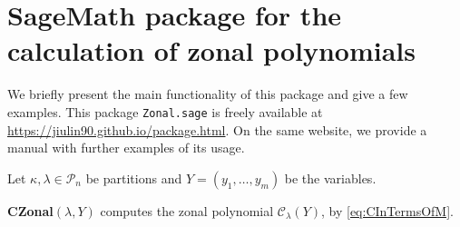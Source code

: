 \documentclass{mathincs}
\numberwithin{equation}{section}
\numberwithin{figure}{section}
\theoremstyle{plain}
\theoremstyle{definition}
\theoremstyle{remark}
\theoremstyle{plain}
\theoremstyle{definition}
\theoremstyle{plain}
\theoremstyle{plain}
\begin{document}
\section{SageMath package for the calculation of zonal polynomials}\label{sec:Package}

We briefly present the main functionality of this package and give a few examples. This package \texttt{Zonal.sage} is freely available at
\url{https://jiulin90.github.io/package.html}.  On the same website, we provide a
manual with further examples of its usage.

Let $\kappa, \lambda\in\mathcal{P}_n$ be partitions and $Y=(y_1,\ldots,y_m)$ be the variables.
\vspace{10bp}

\noindent \textbf{CZonal}$(\lambda, Y)$
computes the zonal polynomial $\mathcal{C}_{\lambda}(Y)$, by \eqref{eq:CInTermsOfM}.
\end{document}
